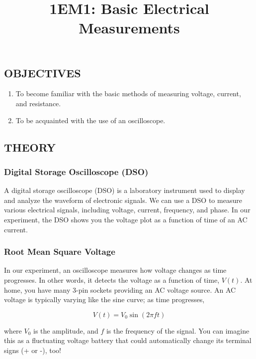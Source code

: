 \documentclass[twocolumn,a4paper,11pt]{article}
\begin{document}
\title{1EM1: Basic Electrical Measurements}
\author{}
\date{}
\maketitle

\subsection*{OBJECTIVES}
\begin{enumerate}
    \item To become familiar with the basic methods of measuring voltage, current, and resistance.
    \item To be acquainted with the use of an oscilloscope.
\end{enumerate}

\subsection*{THEORY}

\subsubsection*{Digital Storage Oscilloscope (DSO)}
A digital storage oscilloscope (DSO) is a laboratory instrument used to display and analyze the waveform of electronic signals. We can use a DSO to measure various electrical signals, including voltage, current, frequency, and phase. In our experiment, the DSO shows you the voltage plot as a function of time of an AC current.

\subsubsection*{Root Mean Square Voltage}
In our experiment, an oscilloscope measures how voltage changes as time progresses. In other words, it detects the voltage as a function of time, \(V(t)\). At home, you have many 3-pin sockets providing an AC voltage source. An AC voltage is typically varying like the sine curve; as time progresses,

\begin{equation}
    V(t) = V_0 \sin(2\pi ft)
\end{equation}

where \(V_0\) is the amplitude, and \(f\) is the frequency of the signal. You can imagine this as a fluctuating voltage battery that could automatically change its terminal signs (+ or -), too!
\end{document}
